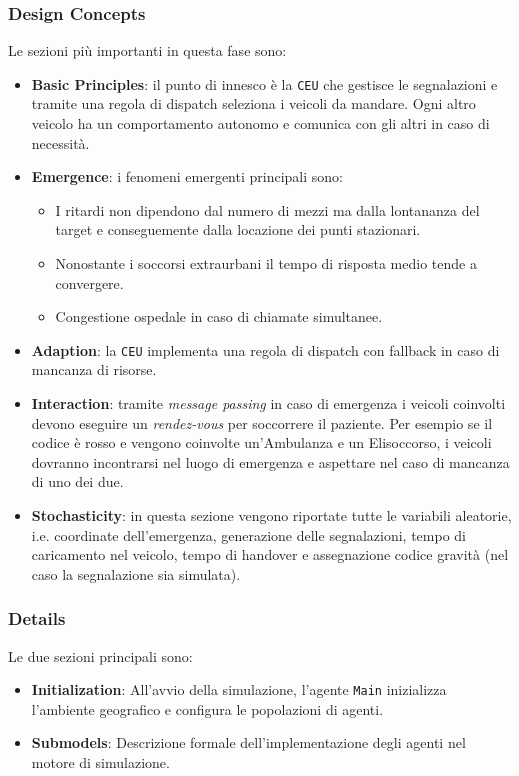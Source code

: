 \documentclass[12pt,a4paper,oneside]{article}
\begin{document}
\subsubsection{Design Concepts}
Le sezioni più importanti in questa fase sono:
\begin{itemize}
    \item \textbf{Basic Principles}: il punto di innesco è la \texttt{CEU}
    che gestisce le segnalazioni e tramite una regola di dispatch seleziona i veicoli da mandare.
    Ogni altro veicolo ha un comportamento autonomo e comunica con gli altri in caso di necessità.
    \item \textbf{Emergence}: i fenomeni emergenti principali sono: 
    \begin{itemize}
        \item I ritardi non dipendono dal numero di mezzi ma dalla lontananza del target e conseguemente dalla locazione dei punti stazionari.
        \item Nonostante i soccorsi extraurbani il tempo di risposta medio tende a convergere.
        \item Congestione ospedale in caso di chiamate simultanee.
    \end{itemize}
    \item \textbf{Adaption}: la \texttt{CEU} implementa una regola di dispatch con fallback in caso di mancanza di risorse.
    \item \textbf{Interaction}: tramite \textit{message passing} in caso di emergenza i veicoli coinvolti devono eseguire un \textit{rendez-vous} per soccorrere il paziente. Per esempio se il codice è rosso e vengono coinvolte un'Ambulanza e un Elisoccorso, i veicoli dovranno incontrarsi nel luogo di emergenza e aspettare nel caso di mancanza di uno dei due.
    \item \textbf{Stochasticity}: in questa sezione vengono riportate tutte le variabili aleatorie, i.e. coordinate dell'emergenza, generazione delle segnalazioni, tempo di caricamento nel veicolo, tempo di handover e assegnazione codice gravità (nel caso la segnalazione sia simulata).
\end{itemize}

\subsubsection{Details}

Le due sezioni principali sono:
\begin{itemize}
    \item \textbf{Initialization}: All'avvio della simulazione, l'agente \texttt{Main} inizializza l'ambiente geografico
    e configura le popolazioni di agenti.
    \item \textbf{Submodels}: Descrizione formale dell'implementazione degli agenti nel motore di simulazione.
\end{itemize}
\end{document}
